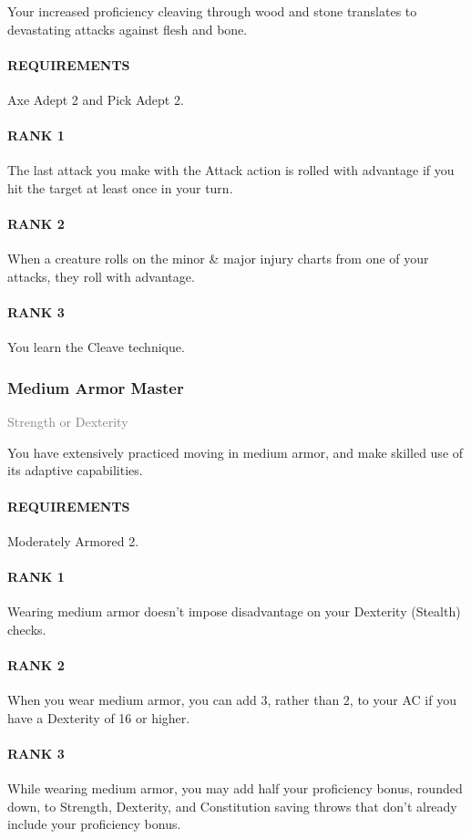 \normalsize
Your increased proficiency cleaving through wood and stone translates to devastating attacks against flesh and bone.
\paragraph{REQUIREMENTS} Axe Adept 2 and Pick Adept 2.
\paragraph{RANK 1} The last attack you make with the Attack action is rolled with advantage if you hit the target at least once in your turn.
\paragraph{RANK 2} When a creature rolls on the minor \& major injury charts from one of your attacks, they roll with advantage.
\paragraph{RANK 3} You learn the Cleave technique.

\subsubsection{Medium Armor Master} \label{feat::mediumarmormaster}
\small{\textcolor{gray}{Strength or Dexterity}}

\normalsize
You have extensively practiced moving in medium armor, and make skilled use of its adaptive capabilities.
\paragraph{REQUIREMENTS} Moderately Armored 2.
\paragraph{RANK 1} Wearing medium armor doesn't impose disadvantage on your Dexterity (Stealth) checks.
\paragraph{RANK 2} When you wear medium armor, you can add 3, rather than 2, to your AC if you have a Dexterity of 16 or higher.
\paragraph{RANK 3} While wearing medium armor, you may add half your proficiency bonus, rounded down, to Strength, Dexterity, and Constitution saving throws that don't already include your proficiency bonus.

